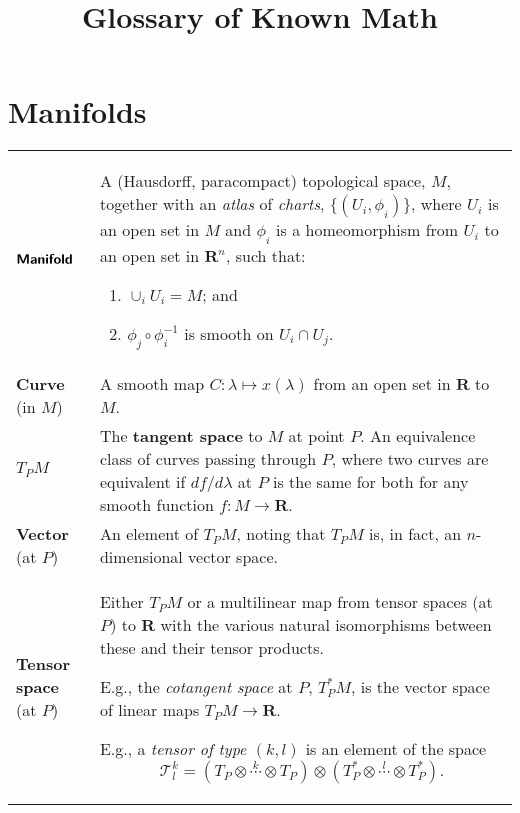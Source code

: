\documentclass[10pt, a4paper, twocolumn]{article}
\title{Glossary of Known Math}
\date{}
\author{}
\newcommand{\defn}[1]{\textbf{\textsf{#1}}}
\newcommand{\set}[1]{\mathbold{#1}}
\newcommand{\reals}{\set{R}}
\begin{document}
\addtolength{}%
\addtolength{}%
\maketitle
\section*{Manifolds}
\begin{tabularx}{\columnwidth}{@{}p{}>{\raggedright\arraybackslash}X@{}}
  \toprule
  $\defn{Manifold}$ & A (Hausdorff, paracompact) topological space, $M$, together with an \emph{atlas} of \emph{charts}, $\{(U_i, \phi_i)\}$, where $U_i$ is an open set in $M$ and $\phi_i$ is a homeomorphism from $U_i$ to an open set in $\reals^n$, such that:
  \begin{enumerate}
  \item $\cup_i U_i = M$; and
  \item $\phi_j \circ \phi_i^{-1}$ is smooth on $U_i \cap U_j$.
  \end{enumerate} \\

  \defn{Curve} (in $M$) & A smooth map $C:\lambda \mapsto x(\lambda)$ from an open set in $\reals$ to $M$. \\

  $T_P M$ & The \defn{tangent space} to $M$ at point $P$. An equivalence class of curves passing through $P$, where two curves are equivalent if $df/d\lambda$ at $P$ is the same for both for any smooth function $f:M \to \reals$. \\

  \defn{Vector} (at $P$) & An element of $T_P M$, noting that $T_P M$ is, in fact, an $n$-dimensional vector space.\\
  
  \defn{Tensor space} (at $P$) & Either $T_P M$ or a multilinear map from tensor spaces (at $P$) to $\reals$ with the various natural isomorphisms between these and their tensor products.

  E.g., the \emph{cotangent space} at $P$, $T^*_P M$, is the vector space of linear maps $T_P M\to\reals$.

  E.g., a \emph{tensor of type $(k, l)$} is an element of the space
  \begin{equation*}
    \mathscr{T}^k_l = (T_P \otimes \overset{k}{\dotsb} \otimes T_P) \otimes (T^*_P \otimes \overset{l}{\dotsb} \otimes T^*_P).  
  \end{equation*} \\
\end{tabularx}






\printbibliography%
\end{document}

